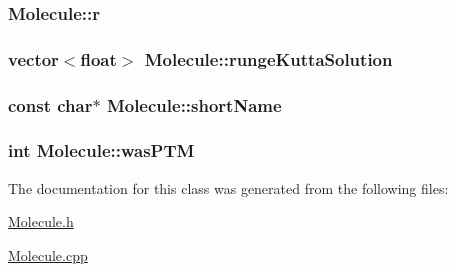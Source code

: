 \label{classMolecule_ae6aff39305dd77531ea5a213b6f2b1c5}
\hypertarget{classMolecule_af036bbaa1f3ec537d3711ae3242d3074}{
\subsubsection[{r}]{ {\bf Molecule::r}}}
\label{classMolecule_af036bbaa1f3ec537d3711ae3242d3074}
\hypertarget{classMolecule_a3e3be6cd7b1286e8d8d489642ab19641}{
\subsubsection[{rungeKuttaSolution}]{\setlength{\rightskip}{0pt plus 5cm}vector$<$float$>$ {\bf Molecule::rungeKuttaSolution}}}
\label{classMolecule_a3e3be6cd7b1286e8d8d489642ab19641}
\hypertarget{classMolecule_ae79f60ef35ffcb500e91013f59563e03}{
\subsubsection[{shortName}]{\setlength{\rightskip}{0pt plus 5cm}const char$\ast$ {\bf Molecule::shortName}}}
\label{classMolecule_ae79f60ef35ffcb500e91013f59563e03}
\hypertarget{classMolecule_a134dd5ffa71953792912c7b0cca01405}{
\subsubsection[{wasPTM}]{\setlength{\rightskip}{0pt plus 5cm}int {\bf Molecule::wasPTM}}}
\label{classMolecule_a134dd5ffa71953792912c7b0cca01405}


The documentation for this class was generated from the following files:\begin{DoxyCompactItemize}
\item 
\hyperlink{Molecule_8h}{Molecule.h}\item 
\hyperlink{Molecule_8cpp}{Molecule.cpp}\end{DoxyCompactItemize}
